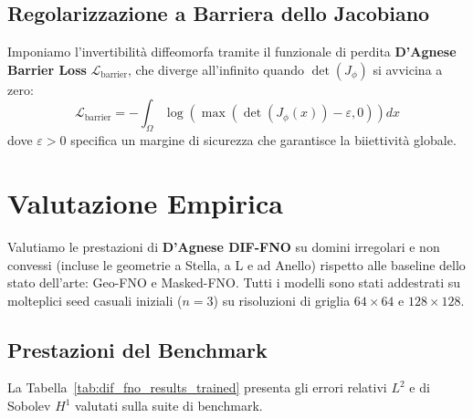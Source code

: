 \documentclass[11pt,a4paper]{article}
\begin{document}
\subsection{Regolarizzazione a Barriera dello Jacobiano}
Imponiamo l'invertibilità diffeomorfa tramite il funzionale di perdita \textbf{D'Agnese Barrier Loss} $\mathcal{L}_{\text{barrier}}$, che diverge all'infinito quando $\det(J_\phi)$ si avvicina a zero:
\begin{equation}
\mathcal{L}_{\text{barrier}} = -\int_{\Omega} \log \left( \max( \det(J_\phi(x)) - \varepsilon, 0 ) \right) dx
\end{equation}
dove $\varepsilon > 0$ specifica un margine di sicurezza che garantisce la biiettività globale.

\section{Valutazione Empirica}
\label{sec:experiments}

Valutiamo le prestazioni di \textbf{D'Agnese DIF-FNO} su domini irregolari e non convessi (incluse le geometrie a Stella, a L e ad Anello) rispetto alle baseline dello stato dell'arte: Geo-FNO e Masked-FNO. Tutti i modelli sono stati addestrati su molteplici seed casuali iniziali ($n=3$) su risoluzioni di griglia $64 \times 64$ e $128 \times 128$.

\subsection{Prestazioni del Benchmark}
La Tabella~\ref{tab:dif_fno_results_trained} presenta gli errori relativi $L^2$ e di Sobolev $H^1$ valutati sulla suite di benchmark.

\begin{table}[htbp]
\centering
\caption{Confronto del Benchmark: Errori Relativi $L^2$ e $H^1$ su geometrie non convesse.}
\label{tab:dif_fno_results_trained}
\end{table}
\end{document}
